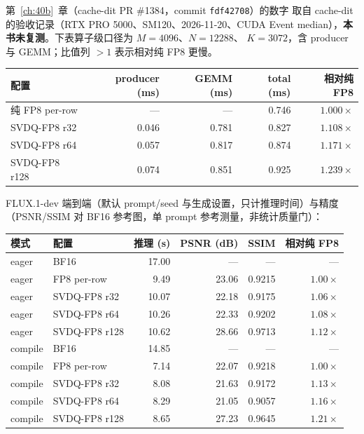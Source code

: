 第~\ref{ch:40b}~章（cache-dit PR \#1384，commit \texttt{fdf42708}）的数字
取自 cache-dit 的验收记录（RTX PRO 5000、SM120、2026-11-20、CUDA Event
median），\textbf{本书未复测}。下表算子级口径为 $M{=}4096$、$N{=}12288$、
$K{=}3072$，含 producer 与 GEMM；比值列 $>1$ 表示相对纯 FP8 更慢。

\begin{center}\small
\begin{tabular}{lrrrr}
\toprule
配置 & producer (ms) & GEMM (ms) & total (ms) & 相对纯 FP8 \\
\midrule
纯 FP8 per-row & --- & --- & 0.746 & $1.000\times$ \\
SVDQ-FP8 r32 & 0.046 & 0.781 & 0.827 & $1.108\times$ \\
SVDQ-FP8 r64 & 0.057 & 0.817 & 0.874 & $1.171\times$ \\
SVDQ-FP8 r128 & 0.074 & 0.851 & 0.925 & $1.239\times$ \\
\bottomrule
\end{tabular}
\end{center}

FLUX.1-dev 端到端（默认 prompt/seed 与生成设置，只计推理时间）与精度
（PSNR/SSIM 对 BF16 参考图，单 prompt 参考测量，非统计质量门）：

\begin{center}\small
\begin{tabular}{llrrrr}
\toprule
模式 & 配置 & 推理 (s) & PSNR (dB) & SSIM & 相对纯 FP8 \\
\midrule
eager & BF16 & 17.00 & --- & --- & --- \\
eager & FP8 per-row & 9.49 & 23.06 & 0.9215 & $1.00\times$ \\
eager & SVDQ-FP8 r32 & 10.07 & 22.18 & 0.9175 & $1.06\times$ \\
eager & SVDQ-FP8 r64 & 10.26 & 22.33 & 0.9202 & $1.08\times$ \\
eager & SVDQ-FP8 r128 & 10.62 & 28.66 & 0.9713 & $1.12\times$ \\
compile & BF16 & 14.85 & --- & --- & --- \\
compile & FP8 per-row & 7.14 & 22.07 & 0.9218 & $1.00\times$ \\
compile & SVDQ-FP8 r32 & 8.08 & 21.63 & 0.9172 & $1.13\times$ \\
compile & SVDQ-FP8 r64 & 8.29 & 21.05 & 0.9057 & $1.16\times$ \\
compile & SVDQ-FP8 r128 & 8.65 & 27.23 & 0.9645 & $1.21\times$ \\
\bottomrule
\end{tabular}
\end{center}

